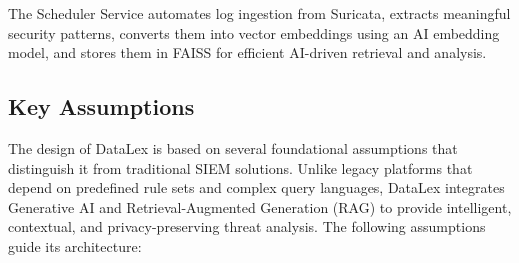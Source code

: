 The Scheduler Service automates log ingestion from Suricata, extracts meaningful security patterns, converts them into vector embeddings using an AI embedding model, and stores them in FAISS for efficient AI-driven retrieval and analysis.

\subsection{Key Assumptions}
\label{subsec_key_assumptions}

The design of DataLex is based on several foundational assumptions that distinguish it from traditional SIEM solutions. Unlike legacy platforms that depend on predefined rule sets and complex query languages, DataLex integrates Generative AI and Retrieval-Augmented Generation (RAG) to provide intelligent, contextual, and privacy-preserving threat analysis. The following assumptions guide its architecture:

